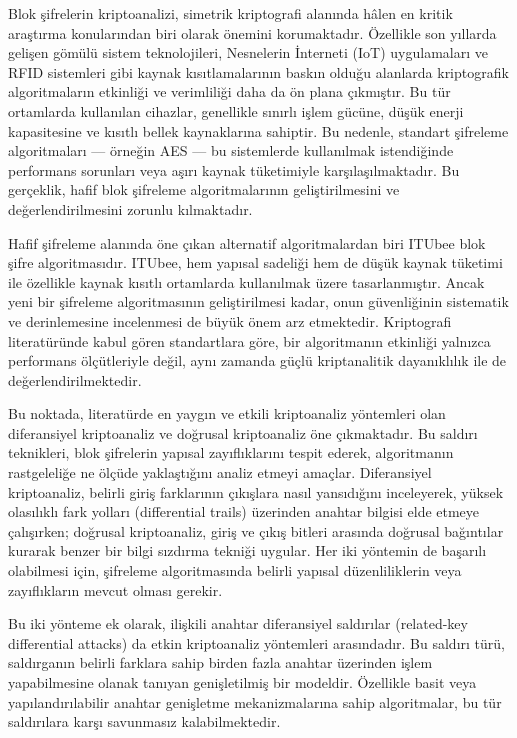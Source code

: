 
Blok şifrelerin kriptoanalizi, simetrik kriptografi alanında hâlen en kritik araştırma konularından biri olarak önemini korumaktadır. Özellikle son yıllarda gelişen gömülü sistem teknolojileri, Nesnelerin İnterneti (IoT) uygulamaları ve RFID sistemleri gibi kaynak kısıtlamalarının baskın olduğu alanlarda kriptografik algoritmaların etkinliği ve verimliliği daha da ön plana çıkmıştır. Bu tür ortamlarda kullanılan cihazlar, genellikle sınırlı işlem gücüne, düşük enerji kapasitesine ve kısıtlı bellek kaynaklarına sahiptir. Bu nedenle, standart şifreleme algoritmaları — örneğin AES — bu sistemlerde kullanılmak istendiğinde performans sorunları veya aşırı kaynak tüketimiyle karşılaşılmaktadır. Bu gerçeklik, hafif blok şifreleme algoritmalarının geliştirilmesini ve değerlendirilmesini zorunlu kılmaktadır.

Hafif şifreleme alanında öne çıkan alternatif algoritmalardan biri ITUbee blok şifre algoritmasıdır. ITUbee, hem yapısal sadeliği hem de düşük kaynak tüketimi ile özellikle kaynak kısıtlı ortamlarda kullanılmak üzere tasarlanmıştır. Ancak yeni bir şifreleme algoritmasının geliştirilmesi kadar, onun güvenliğinin sistematik ve derinlemesine incelenmesi de büyük önem arz etmektedir. Kriptografi literatüründe kabul gören standartlara göre, bir algoritmanın etkinliği yalnızca performans ölçütleriyle değil, aynı zamanda güçlü kriptanalitik dayanıklılık ile de değerlendirilmektedir.

Bu noktada, literatürde en yaygın ve etkili kriptoanaliz yöntemleri olan diferansiyel kriptoanaliz ve doğrusal kriptoanaliz öne çıkmaktadır. Bu saldırı teknikleri, blok şifrelerin yapısal zayıflıklarını tespit ederek, algoritmanın rastgeleliğe ne ölçüde yaklaştığını analiz etmeyi amaçlar. Diferansiyel kriptoanaliz, belirli giriş farklarının çıkışlara nasıl yansıdığını inceleyerek, yüksek olasılıklı fark yolları (differential trails) üzerinden anahtar bilgisi elde etmeye çalışırken; doğrusal kriptoanaliz, giriş ve çıkış bitleri arasında doğrusal bağıntılar kurarak benzer bir bilgi sızdırma tekniği uygular. Her iki yöntemin de başarılı olabilmesi için, şifreleme algoritmasında belirli yapısal düzenliliklerin veya zayıflıkların mevcut olması gerekir.

Bu iki yönteme ek olarak, ilişkili anahtar diferansiyel saldırılar (related-key differential attacks) da  etkin kriptoanaliz yöntemleri arasındadır. Bu saldırı türü, saldırganın belirli farklara sahip birden fazla anahtar üzerinden işlem yapabilmesine olanak tanıyan genişletilmiş bir modeldir. Özellikle basit veya yapılandırılabilir anahtar genişletme mekanizmalarına sahip algoritmalar, bu tür saldırılara karşı savunmasız kalabilmektedir.


